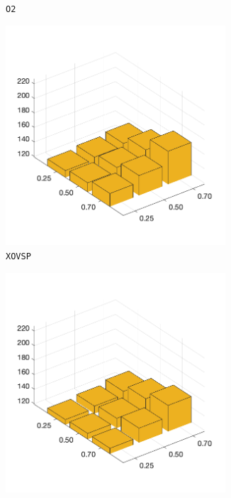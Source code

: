 \begin{figure}[H]
\begin{subfigure}[b]{0.25\textwidth}
		\caption{\texttt{O2}}
		\label{fig:x}
    	\end{subfigure}
%
	\begin{subfigure}[b]{0.25\textwidth}
		\centering
		\includegraphics[width=0.9\textwidth]{crossover/min/cross_sp_3.png}
		\caption{\texttt{XOVSP}}
		\label{fig:y}
    	\end{subfigure}
%
	\begin{subfigure}[b]{0.25\textwidth}
		\centering
		\includegraphics[width=0.9\textwidth]{crossover/min/cross_partial_map_3.png}

\end{subfigure}
\end{figure}

